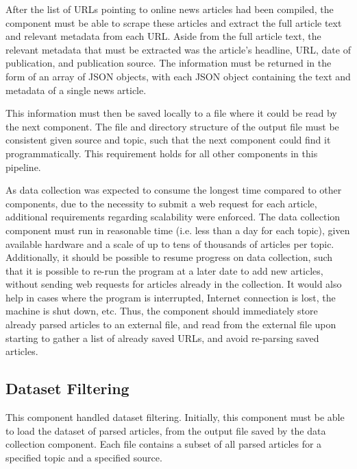 \documentclass{report}
\begin{document}
After the list of URLs pointing to online news articles had been compiled, the component must be able to scrape these articles and extract the full article text and relevant metadata from each URL.
Aside from the full article text, the relevant metadata that must be extracted was the article's headline, URL, date of publication, and publication source.
The information must be returned in the form of an array of JSON objects, with each JSON object containing the text and metadata of a single news article.

This information must then be saved locally to a file where it could be read by the next component. 
The file and directory structure of the output file must be consistent given source and topic, such that the next component could find it programmatically.
This requirement holds for all other components in this pipeline.

As data collection was expected to consume the longest time compared to other components, due to the necessity to submit a web request for each article, additional requirements regarding scalability were enforced.
The data collection component must run in reasonable time (i.e. less than a day for each topic), given available hardware and a scale of up to tens of thousands of articles per topic.
Additionally, it should be possible to resume progress on data collection, such that it is possible to re-run the program at a later date to add new articles, without sending web requests for articles already in the collection.
It would also help in cases where the program is interrupted, Internet connection is lost, the machine is shut down, etc.
Thus, the component should immediately store already parsed articles to an external file, and read from the external file upon starting to gather a list of already saved URLs, and avoid re-parsing saved articles.

\subsection{Dataset Filtering} \label{req-filtering}

This component handled dataset filtering.
Initially, this component must be able to load the dataset of parsed articles, from the output file saved by the data collection component.
Each file contains a subset of all parsed articles for a specified topic and a specified source.
\end{document}

